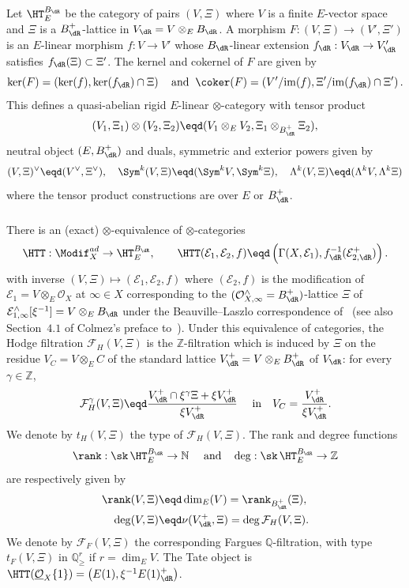Let $\HT_{E}^{B_{\dR}}$ be the category of pairs $(V,\Xi)$ where $V$ is a finite $E$-vector space and $\Xi$ is a $B_{\dR}^{+}$-lattice in $V_{\dR}=V\otimes_{E}B_{\dR}$. A morphism $F:(V,\Xi)\rightarrow(V',\Xi')$ is an $E$-linear morphism $f:V\rightarrow V'$ whose $B_{\dR}$-linear extension $f_{\dR}:V_{\dR}\rightarrow V_{\dR}^{\prime}$ satisfies $f_{\dR}(\Xi)\subset\Xi'$. The kernel and cokernel of $F$ are given by
\[
\ker(F)=\left(\ker(f),\ker(f_{\dR})\cap\Xi\right)\quad\text{and}\;\;\coker(F)=\left(V'/\mathrm{im}(f),\Xi'/\mathrm{im}(f_{\dR})\cap\Xi'\right).
\]
This defines a quasi-abelian rigid $E$-linear $\otimes$-category with tensor product
\[
(V_{1},\Xi_{1})\otimes(V_{2},\Xi_{2})\eqd(V_{1}\otimes_{E}V_{2},\Xi_{1}\otimes_{B_{\dR}^{+}}\Xi_{2}),
\]
neutral object $(E,B_{\dR}^{+})$ and duals, symmetric and exterior powers given by
\[
(V,\Xi)^{\vee}\eqd(V^{\vee},\Xi^{\vee}),\quad\Sym^{k}(V,\Xi)\eqd(\Sym^{k}V,\Sym^{k}\Xi),\quad\Lambda^{k}(V,\Xi)\eqd(\Lambda^{k}V,\Lambda^{k}\Xi)
\]
where the tensor product constructions are over $E$ or $B_{\dR}^{+}$.

\subsubsection{}

There is an (exact) $\otimes$-equivalence of $\otimes$-categories~\cite[4.2.3]{Fa15}
\[
\HTT:\Modif_{X}^{ad}\rightarrow\HT_{E}^{B_{\dR}},\qquad\HTT(\mathcal{E}_{1},\mathcal{E}_{2},f)\eqd\left(\Gamma(X,\mathcal{E}_{1}),f_{\dR}^{-1}(\mathcal{E}_{2,\dR}^{+})\right).
\]
with inverse $(V,\Xi)\mapsto(\mathcal{E}_{1},\mathcal{E}_{2},f)$ where $(\mathcal{E}_{2},f)$ is the modification of $\mathcal{E}_{1}=V\otimes_{E}\mathcal{O}_{X}$ at $\infty\in X$ corresponding to the $(\mathcal{O}_{X,\infty}^{\wedge}=B_{\dR}^{+})$-lattice $\Xi$ of $\mathcal{E}_{1,\infty}^{\wedge}[\xi^{-1}]=V\otimes_{E}B_{\dR}$ under the Beauville--Laszlo correspondence of~\cite[5.3.1]{FaFo15} (see also Section~$4.1$ of Colmez's preface to~\cite{FaFo15}). Under this equivalence of categories, the Hodge filtration $\mathcal{F}_{H}(V,\Xi)$ is the $\mathbb{Z}$-filtration which is induced by $\Xi$ on the residue $V_{C}=V\otimes_{E}C$ of the standard lattice $V_{\dR}^{+}=V\otimes_{E}B_{\dR}^{+}$ of $V_{\dR}$: for every $\gamma\in\mathbb{Z}$,
\[
\mathcal{F}_{H}^{\gamma}(V,\Xi)\eqd\frac{V_{\dR}^{+}\cap\xi^{\gamma}\Xi+\xi V_{\dR}^{+}}{\xi V_{\dR}^{+}}\quad\text{ in}\quad V_{C}=\frac{V_{\dR}^{+}}{\xi V_{\dR}^{+}}.
\]
We denote by $t_{H}(V,\Xi)$ the type of $\mathcal{F}_{H}(V,\Xi)$. The rank and degree functions
\[
\rank:\sk\,\HT_{E}^{B_{\dR}}\rightarrow\mathbb{N}\quad\text{ and}\quad\deg:\sk\,\HT_{E}^{B_{\dR}}\rightarrow\mathbb{Z}
\]
are respectively given by
\[
\begin{aligned}\rank(V,\Xi) & \eqd\dim_{E}(V)=\rank_{B_{\dR}^{+}}(\Xi),\\
\deg(V,\Xi) & \eqd\nu(V_{\dR}^{+},\Xi)=\deg\mathcal{F}_{H}(V,\Xi).
\end{aligned}
\]
We denote by $\mathcal{F}_{F}(V,\Xi)$ the corresponding Fargues $\mathbb{Q}$-filtration, with type $t_{F}(V,\Xi)$ in $\mathbb{Q}_{\geq}^{r}$ if $r=\dim_{E}V$. The Tate object is $\HTT(\underline{\mathcal{O}}_{X}\{1\})=\left(E(1),\xi^{-1}E(1)_{\dR}^{+}\right)$.

